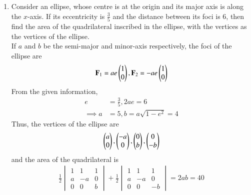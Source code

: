 \begin{enumerate}[label=\arabic*.,ref=\thesubsection.\theenumi]
\item  Consider an ellipse, whose centre is at the origin and its major axis is along the $x$-axis.  If its 
eccentricity is $\frac{3}{5}$ and the distance between its foci is 6, then find the area of the quadrilateral 
inscribed in the ellipse,  with the vertices as the vertices of the ellipse.
\\
\solution If $a$ and $b$ be the semi-major and minor-axis respectively, 
the foci of the ellipse are 
\begin{align}
\mathbf{F}_1=ae\begin{pmatrix}1\\0\end{pmatrix},
\mathbf{F}_2=-ae\begin{pmatrix}1\\0\end{pmatrix}
\end{align}
%
From the given information,
\begin{align}
e &= \frac{3}{5}, 2ae = 6 
\\
\implies a &= 5, b = a\sqrt{1-e^2} = 4
\end{align}
%
Thus, the vertices of the ellipse are
\begin{align}
\begin{pmatrix}a\\0\end{pmatrix},
\begin{pmatrix}-a\\0\end{pmatrix},
\begin{pmatrix}0\\b\end{pmatrix},
\begin{pmatrix}0\\-b\end{pmatrix}
\end{align}
and the area of the quadrilateral is
\begin{align}
\frac{1}{2}
\begin{vmatrix}
1 & 1 & 1
\\
a & -a & 0
\\
0 & 0 & b
\end{vmatrix}
+
\frac{1}{2}
\begin{vmatrix}
1 & 1 & 1
\\
a & -a & 0
\\
0 & 0 & -b
\end{vmatrix}
=2ab = 40
\end{align}


\end{enumerate}
